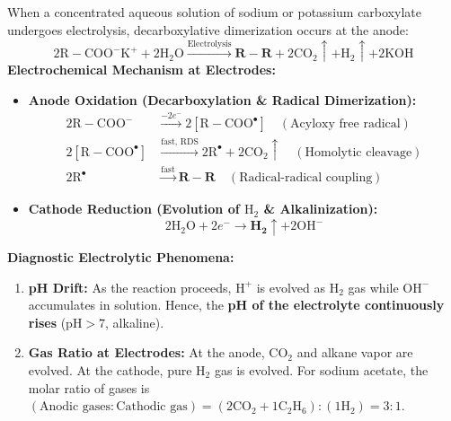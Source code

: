 \documentclass[10pt,twoside,openright]{book}
\begin{document}
\begin{formulabox}
When a concentrated aqueous solution of sodium or potassium carboxylate undergoes electrolysis, decarboxylative dimerization occurs at the anode:
\begin{equation}
  2\mathrm{R-COO^-K^+} + 2\mathrm{H_2O} \xrightarrow{\text{Electrolysis}} \mathbf{R-R} + 2\mathrm{CO_2}\uparrow + \mathrm{H_2}\uparrow + 2\mathrm{KOH}
\end{equation}
\textbf{Electrochemical Mechanism at Electrodes:}
\begin{itemize}
  \item \textbf{Anode Oxidation (Decarboxylation \& Radical Dimerization):}
  \begin{align}
    2\mathrm{R-COO^-} &\xrightarrow{-2e^-} 2[\mathrm{R-COO^\bullet}] \quad (\text{Acyloxy free radical})\\
    2[\mathrm{R-COO^\bullet}] &\xrightarrow{\text{fast, RDS}} 2\mathrm{R^\bullet} + 2\mathrm{CO_2}\uparrow \quad (\text{Homolytic cleavage})\\
    2\mathrm{R^\bullet} &\xrightarrow{\text{fast}} \mathbf{R-R} \quad (\text{Radical-radical coupling})
  \end{align}
  \item \textbf{Cathode Reduction (Evolution of $\mathrm{H_2}$ \& Alkalinization):}
  \begin{equation}
    2\mathrm{H_2O} + 2e^- \to \mathbf{H_2}\uparrow + 2\mathrm{OH^-}
  \end{equation}
\end{itemize}
\textbf{Diagnostic Electrolytic Phenomena:}
\begin{enumerate}[leftmargin=*]
  \item \textbf{pH Drift:} As the reaction proceeds, $\mathrm{H^+}$ is evolved as $\mathrm{H_2}$ gas while $\mathrm{OH^-}$ accumulates in solution. Hence, the \textbf{pH of the electrolyte continuously rises} ($\mathrm{pH} > 7$, alkaline).
  \item \textbf{Gas Ratio at Electrodes:} At the anode, $\mathrm{CO_2}$ and alkane vapor are evolved. At the cathode, pure $\mathrm{H_2}$ gas is evolved. For sodium acetate, the molar ratio of gases is $(\text{Anodic gases} : \text{Cathodic gas}) = (2\mathrm{CO_2} + 1\mathrm{C_2H_6}) : (1\mathrm{H_2}) = 3 : 1$.
\end{enumerate}
\end{formulabox}
\end{document}
